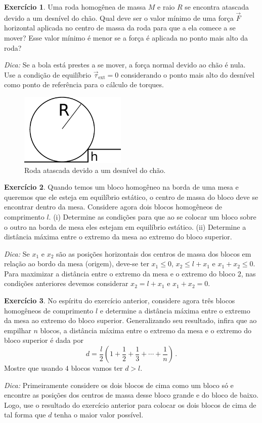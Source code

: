 \documentclass[papersize=a4,DIV=calc,twocolumn=on]{scrartcl}
\newcommand{\dpar}[1]{\left(#1\right)}
\theoremstyle{definition}
\newtheorem{ex}{Exercício}[section]
\begin{document}
\begin{ex}
  Uma roda homogênea de massa $M$ e raio $R$ se encontra atascada
  devido a um desnível do chão. Qual deve ser o valor mínimo de uma
  força $\vec F$ horizontal aplicada no centro de massa da roda para
  que a ela comece a se mover? Esse valor mínimo é menor se a força é
  aplicada no ponto mais alto da roda?

  \noindent\textit{Dica:} Se a bola está prestes a se mover, a força
  normal devido ao chão é nula. Use a condição de equilíbrio
  $\vec\tau_{\mathrm{ext}}=0$ considerando o ponto mais alto do
  desnível como ponto de referência para o cálculo de torques.
  \begin{figure}[ht]
    \centering
    \includegraphics[width=0.45\textwidth,keepaspectratio]{roda_obstaculo.pdf}
    \caption{Roda atascada devido a um desnível do chão.}
    \label{fig:roda_obstaculo}
  \end{figure}
\end{ex}

\begin{ex}
  Quando temos um bloco homogêneo na borda de uma mesa e queremos que
  ele esteja em equilíbrio estático, o centro de massa do bloco deve
  se encontrar dentro da mesa. Considere agora dois blocos homogêneos
  de comprimento $l$. (i) Determine as condições para que ao se
  colocar um bloco sobre o outro na borda de mesa eles estejam em
  equilíbrio estático. (ii) Determine a distância máxima entre o
  extremo da mesa ao extremo do bloco superior.

  \noindent\textit{Dica:} Se $x_1$ e $x_2$ são as posições horizontais
  dos centros de massa dos blocos em relação ao bordo da mesa
  (origem), deve-se ter $x_1\le 0$, $x_2\le l+x_1$ e $x_1+x_2\le
  0$. Para maximizar a distância entre o extremo da mesa e o extremo
  do bloco $2$, nas condições anteriores devemos considerar
  $x_2=l+x_1$ e $x_1+x_2=0$.
\end{ex}

\begin{ex}
  No espíritu do exercício anterior, considere agora três blocos
  homogêneos de comprimento $l$ e determine a distância máxima entre o
  extremo da mesa ao extremo do bloco superior. Generalizando seu
  resultado, infira que ao empilhar $n$ blocos, a distância máxima
  entre o extremo da mesa e o extremo do bloco superior é dada por
  $$d=\frac{l}{2}\dpar{1+\frac{1}{2}+\frac{1}{3}+\cdots+\frac{1}{n}}\,.$$
  Mostre que usando $4$ blocos vamos ter $d>l$.

  \noindent\textit{Dica:} Primeiramente considere os dois blocos de
  cima como um bloco só e encontre as posições dos centros de massa
  desse bloco grande e do bloco de baixo. Logo, use o resultado do
  exercício anterior para colocar os dois blocos de cima de tal forma
  que $d$ tenha o maior valor possível.
\end{ex}
\end{document}
